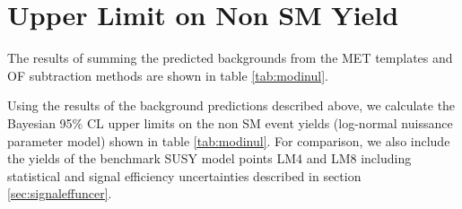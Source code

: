 \section{Upper Limit on Non SM Yield}
\label{sec:upperlimit}

The results of summing the predicted backgrounds from the MET templates and OF subtraction
methods are shown in table \ref{tab:modinul}.

\begin{comment}
\begin{table}[hbt]
  \begin{center}
	\caption{
	  \label{tab:systrestot}
	  Combination of predictions from MET templates and OF subtraction.
	}
	\begin{tabular}{lcccc}
	  \hline
	  \resulttitle
\hline

\hline
	\end{tabular}
  \end{center}
\end{table}
\end{comment}


Using the results of the background predictions described above,
we calculate the Bayesian 95\% CL
upper limits on the non SM event yields 
(log-normal nuissance parameter model) 
shown in 
table \ref{tab:modinul}.
For comparison, we also include the yields of the benchmark SUSY model points LM4 and LM8
including statistical and signal efficiency uncertainties 
described in section \ref{sec:signaleffuncer}.

